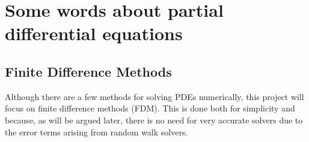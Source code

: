 % 


\section{Some words about partial differential equations}\label{some_words_on_PDEs}

\subsection{Finite Difference Methods}\label{finite_difference_methods}

Although there are a few methods for solving PDEs numerically, this project will focus on finite difference methods (FDM). 
This is done both for simplicity and because, as will be argued later, there is no need for very accurate solvers due to the error terms arising from random walk solvers. 

